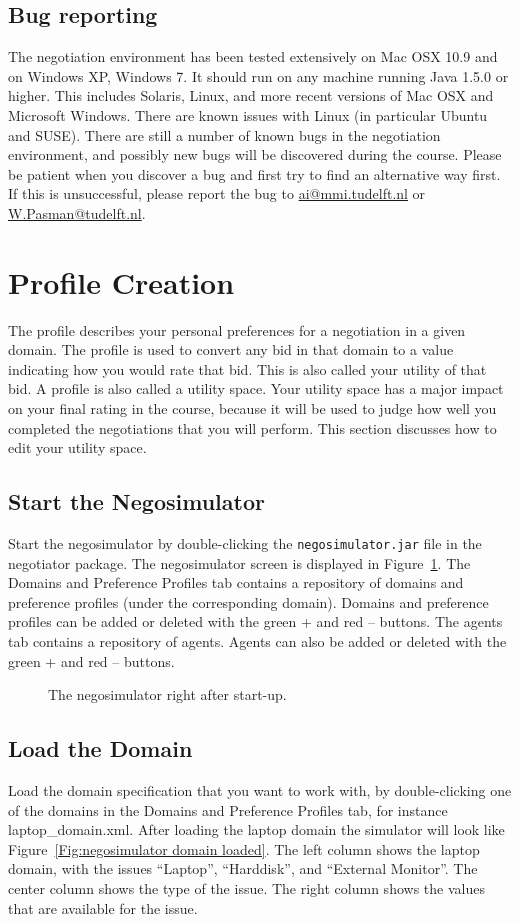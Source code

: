 \documentclass[]{article}
\begin{document}
\subsection{Bug reporting}
The negotiation environment has been tested extensively on Mac OSX 10.9 and on Windows XP, Windows 7. It should run on any machine running Java 1.5.0 or higher. This includes Solaris, Linux, and more recent versions of Mac OSX and Microsoft Windows. There are known issues with Linux (in particular Ubuntu and SUSE). There are still a number of known bugs in the negotiation environment, and possibly new bugs will be discovered during the course. Please be patient when you discover a bug and first try to find an alternative way first. If this is unsuccessful, please report the bug to \url{ai@mmi.tudelft.nl} or \url{W.Pasman@tudelft.nl}.
 
\section{Profile Creation}
The profile describes your personal preferences for a negotiation in a given domain. The profile is used to convert any bid in that domain to a value indicating how you would rate that bid. This is also called your utility of that bid. A profile is also called a utility space. Your utility space has a major impact on your final rating in the course, because it will be used to judge how well you completed the negotiations that you will perform. This section discusses how to edit your utility space.

\subsection{Start the Negosimulator}
Start the negosimulator by double-clicking the \texttt{negosimulator.jar} file in the negotiator package. The negosimulator screen is displayed in Figure~\ref{Fig:negosimulator start}. The Domains and Preference Profiles tab contains a repository of domains and preference profiles (under the corresponding domain). Domains and preference profiles can be added or deleted with the green + and red – buttons. The agents tab contains a repository of agents. Agents can also be added or deleted with the green + and red – buttons.

\begin{figure}
\caption{The negosimulator right after start-up.}\label{Fig:negosimulator start}
\end{figure}

\subsection{Load the Domain}
Load the domain specification that you want to work with, by double-clicking one of the domains in the Domains and Preference Profiles tab, for instance laptop\_domain.xml. After loading the laptop domain the simulator will look like Figure~\ref{Fig:negosimulator domain loaded}. The left column shows the laptop domain, with the issues ``Laptop'', ``Harddisk'', and ``External Monitor''. The center column shows the type of the issue. The right column shows the values that are available for the issue.
\end{document}
